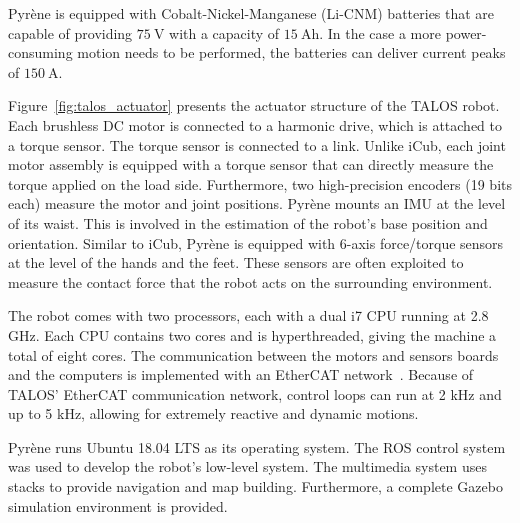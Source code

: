 \par
Pyr\`{e}ne is equipped with Cobalt-Nickel-Manganese (Li-CNM) batteries that are capable of providing $\SI{75}{\volt}$ with a capacity of $\SI{15}{\ampere \hour}$. In the case a more power-consuming motion needs to be performed, the batteries can deliver current peaks of $\SI{150}{\ampere}$.
\par
Figure~\ref{fig:talos_actuator} presents the actuator structure of the TALOS robot. Each brushless DC motor is connected to a harmonic drive, which is attached to a torque sensor. The torque sensor is connected to a link.
Unlike iCub, each joint motor assembly is equipped with a torque sensor that can directly measure the torque applied on the load side. Furthermore, two high-precision encoders (19 bits each) measure the motor and joint positions.
Pyr\`{e}ne mounts an IMU at the level of its waist. This is involved in the estimation of the robot's base position and orientation. Similar to iCub, Pyr\`{e}ne is equipped with 6-axis force/torque sensors at the level of the hands and the feet. These sensors are often exploited to measure the contact force that the robot acts on the surrounding environment. 

\par
The robot comes with two processors, each with a dual i7 CPU running at 2.8 GHz. Each CPU contains two cores and is hyperthreaded, giving the machine a total of eight cores. 
The communication between the motors and sensors boards and the computers is implemented with an EtherCAT network~\citep{IEC61158-12019IndustrialSeries}. Because of TALOS' EtherCAT communication network, control loops can run at 2 kHz and up to 5 kHz, allowing for extremely reactive and dynamic motions.
\par
Pyr\`{e}ne runs Ubuntu 18.04 LTS as its operating system.
The ROS control system was used to develop the robot's low-level system.
The multimedia system uses stacks to provide navigation and map building. Furthermore, a complete Gazebo~\citep{Koenig04} simulation environment is provided.